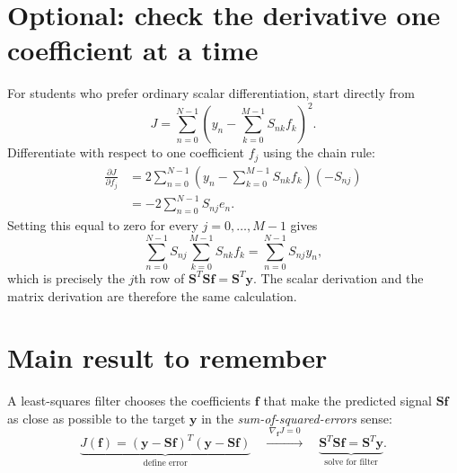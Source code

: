\documentclass[11pt,letterpaper]{article}
\newcommand{\Smat}{\mathbf{S}}
\newcommand{\fvec}{\mathbf{f}}
\newcommand{\yvec}{\mathbf{y}}
\begin{document}
\section{Optional: check the derivative one coefficient at a time}
For students who prefer ordinary scalar differentiation, start directly from
\begin{equation}
J=\sum_{n=0}^{N-1}\left(y_n-\sum_{k=0}^{M-1}S_{nk}f_k\right)^2.
\end{equation}
Differentiate with respect to one coefficient $f_j$ using the chain rule:
\begin{align}
\frac{\partial J}{\partial f_j}
&=2\sum_{n=0}^{N-1}
\left(y_n-\sum_{k=0}^{M-1}S_{nk}f_k\right)(-S_{nj})\\
&=-2\sum_{n=0}^{N-1}S_{nj}e_n.
\end{align}
Setting this equal to zero for every $j=0,\ldots,M-1$ gives
\begin{equation}
\sum_{n=0}^{N-1}S_{nj}\sum_{k=0}^{M-1}S_{nk}f_k
=\sum_{n=0}^{N-1}S_{nj}y_n,
\end{equation}
which is precisely the $j$th row of $\Smat^T\Smat\fvec=\Smat^T\yvec$.
The scalar derivation and the matrix derivation are therefore the same calculation.

\section*{Main result to remember}
A least-squares filter chooses the coefficients $\fvec$ that make the
predicted signal $\Smat\fvec$ as close as possible to the target $\yvec$
in the \emph{sum-of-squared-errors} sense:
\begin{equation*}
\underbrace{J(\fvec)=(\yvec-\Smat\fvec)^T(\yvec-\Smat\fvec)}_{\text{define error}}
\quad\xrightarrow{\;\nabla_{\fvec}J=0\;}\quad
\underbrace{\Smat^T\Smat\fvec=\Smat^T\yvec}_{\text{solve for filter}}.
\end{equation*}
\end{document}
